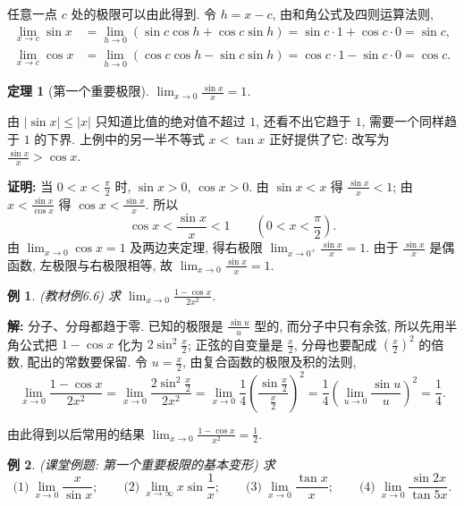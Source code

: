 \documentclass[UTF8,openany]{ctexbook}
\theoremstyle{chinesetextbook}
\newtheorem{example}{例}[section]
\newtheorem{theorem}{定理}[section]
\newenvironment{cnproof}{\par\indent\textbf{证明:} \ignorespaces}{\par}
\newenvironment{cnsolution}{\par\indent\textbf{解:} \ignorespaces}{\par}
\begin{document}
任意一点 $c$ 处的极限可以由此得到. 令 $h=x-c$, 由和角公式及四则运算法则,
\[
\begin{aligned}
\lim_{x\to c}\sin x&=\lim_{h\to0}(\sin c\cos h+\cos c\sin h)=\sin c\cdot1+\cos c\cdot0=\sin c,\\
\lim_{x\to c}\cos x&=\lim_{h\to0}(\cos c\cos h-\sin c\sin h)=\cos c\cdot1-\sin c\cdot0=\cos c.
\end{aligned}
\]
\begin{theorem}[第一个重要极限]
$\displaystyle\lim_{x\to0}\frac{\sin x}x=1$.
\end{theorem}
由 $|\sin x|\le|x|$ 只知道比值的绝对值不超过 $1$, 还看不出它趋于 $1$, 需要一个同样趋于 $1$ 的下界. 上例中的另一半不等式 $x<\tan x$ 正好提供了它: 改写为 $\displaystyle\frac{\sin x}x>\cos x$.
\begin{cnproof}
当 $\displaystyle0<x<\frac\pi2$ 时, $\sin x>0$, $\cos x>0$. 由 $\sin x<x$ 得 $\displaystyle\frac{\sin x}x<1$; 由 $\displaystyle x<\frac{\sin x}{\cos x}$ 得 $\displaystyle\cos x<\frac{\sin x}x$. 所以
\[
\cos x<\frac{\sin x}x<1\qquad\left(0<x<\frac\pi2\right).
\]
由 $\displaystyle\lim_{x\to0}\cos x=1$ 及两边夹定理, 得右极限 $\displaystyle\lim_{x\to0^+}\frac{\sin x}x=1$. 由于 $\displaystyle\frac{\sin x}x$ 是偶函数, 左极限与右极限相等, 故 $\displaystyle\lim_{x\to0}\frac{\sin x}x=1$.
\end{cnproof}
\begin{example}
\textnormal{(教材例6.6)} 求 $\displaystyle\lim_{x\to0}\frac{1-\cos x}{2x^2}$.
\end{example}
\begin{cnsolution}
分子、分母都趋于零. 已知的极限是 $\displaystyle\frac{\sin u}u$ 型的, 而分子中只有余弦, 所以先用半角公式把 $1-\cos x$ 化为 $\displaystyle2\sin^2\frac x2$; 正弦的自变量是 $\displaystyle\frac x2$, 分母也要配成 $\displaystyle\left(\frac x2\right)^2$ 的倍数, 配出的常数要保留. 令 $\displaystyle u=\frac x2$, 由复合函数的极限及积的法则,
\[
\lim_{x\to0}\frac{1-\cos x}{2x^2}=\lim_{x\to0}\frac{2\sin^2\frac x2}{2x^2}=\lim_{x\to0}\frac14\left(\frac{\sin\frac x2}{\frac x2}\right)^2=\frac14\left(\lim_{u\to0}\frac{\sin u}u\right)^2=\frac14.
\]
\end{cnsolution}
由此得到以后常用的结果 $\displaystyle\lim_{x\to0}\frac{1-\cos x}{x^2}=\frac12$.
\begin{example}
\textnormal{(课堂例题: 第一个重要极限的基本变形)} 求
\[
\text{(1)}\ \lim_{x\to0}\frac x{\sin x};\qquad\text{(2)}\ \lim_{x\to\infty}x\sin\frac1x;\qquad\text{(3)}\ \lim_{x\to0}\frac{\tan x}x;\qquad\text{(4)}\ \lim_{x\to0}\frac{\sin2x}{\tan5x}.
\]
\end{example}
\end{document}
